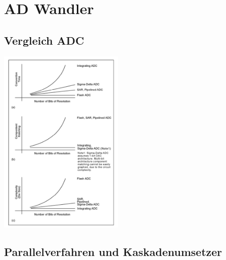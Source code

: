 \section{AD Wandler }

\subsection{Vergleich ADC}
\includegraphics[width=6cm, valign=t]{pictures/vergleich_ADC.png}

\newpage

\subsection{Parallelverfahren und Kaskadenumsetzer}

